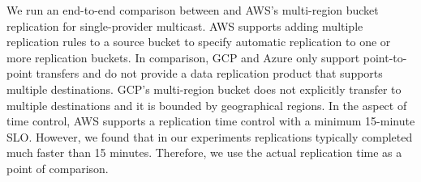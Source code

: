 
We run an end-to-end comparison between \sys{} and AWS's multi-region bucket replication\cite{aws-replication} for single-provider multicast.
AWS supports adding multiple replication rules to a source bucket to specify automatic replication to one or more replication buckets. 
In comparison, GCP and Azure only support point-to-point transfers and do not provide a data replication product that supports multiple destinations. GCP's multi-region bucket does not explicitly transfer to multiple destinations and it is bounded by geographical regions. 
In the aspect of time control, AWS supports a replication time control with a minimum 15-minute SLO. However, we found that in our experiments replications typically completed much faster than 15 minutes. Therefore, we use the actual replication time as a point of comparison. 



